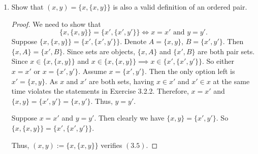 \documentclass[12pt, letter]{article}
\begin{document}
\begin{enumerate}
\begin{proof}
        Then, we need to show that whenever $X$ and $Y$ are sets, the Cartesian product $X\times Y$ is a set.
        Use the definition above: $(x,y)=\{\{x\},\{x,y\}\}$. The powerset of $X\cup Y$ is $\{0,\{x\},\{y\},\{x,y\}\}$ which contains the elements in 
        $(x,y)$. Then the powerset of the powerset of $X\cup Y$ contains $(x,y)$. The elements in $\mathcal{P}(\mathcal{P}(X\cup Y))$ is a set, thus, the Cartesian 
        product is a set. More specifically, 
        \begin{equation*}
            X\times Y=\{z\in \mathcal{P}(\mathcal{P}(X\cup Y)):z \text{ contains exactly one singleton set and one pair set}\}.
        \end{equation*}
    \end{proof}
    \item Show that $(x,y)=\{x,\{x,y\}\}$ is also a valid definition of an ordered pair.
    \begin{proof}
        We need to show that 
    \begin{equation*}
        \{x,\{x,y\}\}=\{x',\{x',y'\}\}\iff x=x'\text{ and }y=y'.    
    \end{equation*}
    Suppose $\{x,\{x,y\}\}=\{x',\{x',y'\}\}$. Denote $A=\{x,y\}$, $B=\{x',y'\}$. Then $\{x,A\}=\{x',B\}$. Since sets are objects, $\{x,A\}$ and 
   $\{x',B\}$ are both pair sets. Since $x\in \{x,\{x,y\}\}$ and $x\in\{x,\{x,y\}\}\implies x\in\{x',\{x',y'\}\}$. So either $x=x'$ or $x=\{x',y'\}$.
   Assume $x=\{x',y'\}$. Then the only option left is $x'=\{x,y\}$. As $x$ and $x'$ are both sets, having $x\in x'$ and $x'\in x$ at the same time violates
   the statements in Exercise 3.2.2. Therefore, $x=x'$ and $\{x,y\}=\{x',y'\}=\{x,y'\}$. Thus, $y=y'$. 
   
   Suppose $x=x'$ and $y=y'$. Then clearly we have $\{x,y\}=\{x',y'\}$. So $\{x,\{x,y\}\}=\{x',\{x',y'\}\}$. 

   Thus, $(x,y):=\{x,\{x,y\}\}$ verifies $(3.5)$.
    \end{proof}
\end{enumerate}
\end{document}
